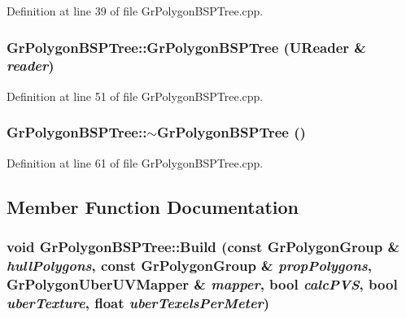 Definition at line 39 of file GrPolygonBSPTree.cpp.\hypertarget{class_gr_polygon_b_s_p_tree_63d865618b1e83cd5c70bca92a063fbc}{
\subsubsection[{GrPolygonBSPTree}]{\setlength{\rightskip}{0pt plus 5cm}GrPolygonBSPTree::GrPolygonBSPTree ({\bf UReader} \& {\em reader})}}
\label{class_gr_polygon_b_s_p_tree_63d865618b1e83cd5c70bca92a063fbc}




Definition at line 51 of file GrPolygonBSPTree.cpp.\hypertarget{class_gr_polygon_b_s_p_tree_fe44300f3e1906f765db54da9e7805ce}{
\subsubsection[{$\sim$GrPolygonBSPTree}]{\setlength{\rightskip}{0pt plus 5cm}GrPolygonBSPTree::$\sim$GrPolygonBSPTree ()}}
\label{class_gr_polygon_b_s_p_tree_fe44300f3e1906f765db54da9e7805ce}




Definition at line 61 of file GrPolygonBSPTree.cpp.

\subsection{Member Function Documentation}
\hypertarget{class_gr_polygon_b_s_p_tree_fdf27337605659e3b54cbbc481cc8dbd}{
\subsubsection[{Build}]{\setlength{\rightskip}{0pt plus 5cm}void GrPolygonBSPTree::Build (const {\bf GrPolygonGroup} \& {\em hullPolygons}, \/  const {\bf GrPolygonGroup} \& {\em propPolygons}, \/  {\bf GrPolygonUberUVMapper} \& {\em mapper}, \/  bool {\em calcPVS}, \/  bool {\em uberTexture}, \/  float {\em uberTexelsPerMeter})}}
\label{class_gr_polygon_b_s_p_tree_fdf27337605659e3b54cbbc481cc8dbd}




